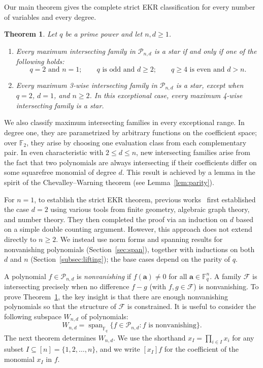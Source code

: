 \documentclass[12pt,reqno]{amsart}
\newtheorem{thm}{Theorem}[section]
\theoremstyle{definition}
\newcommand{\F}{\mathbb{F}}
\newcommand{\cP}{\mathcal P}
\begin{document}
Our main theorem gives the complete strict EKR classification for
every number of variables and every degree.

\begin{thm}\label{thm:main}
Let $q$ be a prime power and let $n,d\geq1$.
\begin{enumerate}[(1)]
\item Every maximum intersecting family in $\cP_{n,d}$ is a star if
and only if one of the following holds:
\[
  q=2\text{ and }n=1;\qquad
  q\text{ is odd and }d\geq2;\qquad
  q\geq4\text{ is even and }d>n.
\]
\item Every maximum 3-wise intersecting family in $\cP_{n,d}$ is
a star, except when $q=2$, $d=1$, and $n\geq2$. In this exceptional
case, every maximum 4-wise intersecting family is a star.
\end{enumerate}
\end{thm}

We also classify maximum intersecting families in every exceptional
range. In degree one, they are parametrized by arbitrary functions on
the coefficient space; over $\F_2$, they arise by choosing one evaluation class from each complementary pair. In even characteristic with $2\leq d\leq n$, new intersecting families arise from the fact that two polynomials are always intersecting if their coefficients differ on some squarefree monomial of degree $d$. This result is achieved by a lemma in the spirit of the Chevalley--Warning theorem (see Lemma~\ref{lem:parity}).

For $n=1$, to establish the strict EKR theorem, previous works~\cite{A22, A22b, ACW24} first established the case $d=2$ using various tools from finite geometry, algebraic graph theory, and number theory. They then completed the proof via an induction on $d$ based on a simple double counting argument. However, this approach does not extend directly to $n\geq 2$. We instead use norm forms and spanning results for nonvanishing polynomials (Section~\ref{sec:span}), together with inductions on both $d$ and $n$ (Section~\ref{subsec:lifting}); the base cases depend on the parity of $q$.

A polynomial $f\in\cP_{n,d}$ is \emph{nonvanishing} if $f(\mathbf{a})\neq 0$ for all $\mathbf{a}\in \F_{q}^{n}$. A family $\mathcal{F}$ is intersecting precisely when no difference $f-g$ (with $f,g\in\mathcal F$) is nonvanishing. To prove Theorem~\ref{thm:main}, the key insight is that there are enough nonvanishing polynomials so that the structure of $\mathcal{F}$ is constrained. It is useful to consider the following subspace $W_{n,d}$ of polynomials:
\[
W_{n,d}=\operatorname{span}_{\F_q}\{f \in\cP_{n,d} : f \text{ is nonvanishing}\}.
\]
The next theorem determines $W_{n,d}$. We use the shorthand $x_{I}=\prod_{i\in I}x_i$ for any subset $I\subseteq [n]=\{1,2,\dots, n\}$, and we write $[x_I]f$ for the coefficient of the monomial $x_{I}$ in $f$.
\end{document}
